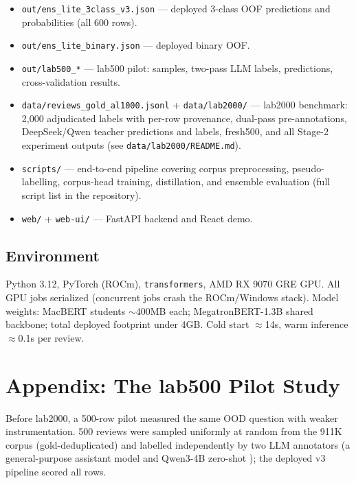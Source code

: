 \documentclass[11pt,a4paper]{article}
\newcommand{\code}[1]{\texttt{#1}}
\begin{document}
\begin{itemize}
  \item \code{out/ens\_lite\_3class\_v3.json} --- deployed 3-class OOF
        predictions and probabilities (all 600 rows).
  \item \code{out/ens\_lite\_binary.json} --- deployed binary OOF.
  \item \code{out/lab500\_*} --- lab500 pilot: samples, two-pass LLM labels,
        predictions, cross-validation results.
  \item \code{data/reviews\_gold\_al1000.jsonl} + \code{data/lab2000/}
        --- lab2000 benchmark: 2{,}000 adjudicated labels with
        per-row provenance, dual-pass pre-annotations, DeepSeek/Qwen
        teacher predictions and labels, fresh500, and all Stage-2
        experiment outputs (see \code{data/lab2000/README.md}).
  \item \code{scripts/} --- end-to-end pipeline covering corpus
        preprocessing, pseudo-labelling, corpus-head training,
        distillation, and ensemble evaluation (full script list in the
        repository).
  \item \code{web/} + \code{web-ui/} --- FastAPI backend and React demo.
\end{itemize}

\subsection{Environment}

Python 3.12, PyTorch (ROCm), \code{transformers}, AMD RX 9070 GRE GPU.
All GPU jobs serialized (concurrent jobs crash the ROCm/Windows stack).
Model weights: MacBERT students $\sim$400MB each; MegatronBERT-1.3B
shared backbone; total deployed footprint under 4GB. Cold start
$\approx$14s, warm inference $\approx$0.1s per review.

\section{Appendix: The lab500 Pilot Study}
\label{app:lab500}

Before lab2000, a 500-row pilot measured the same OOD question with
weaker instrumentation. 500 reviews were sampled uniformly at random
from the 911K corpus (gold-deduplicated) and labelled independently by
two LLM annotators (a general-purpose assistant model and Qwen3-4B
zero-shot \citep{qwen2025}); the deployed v3 pipeline scored all rows.
\end{document}

